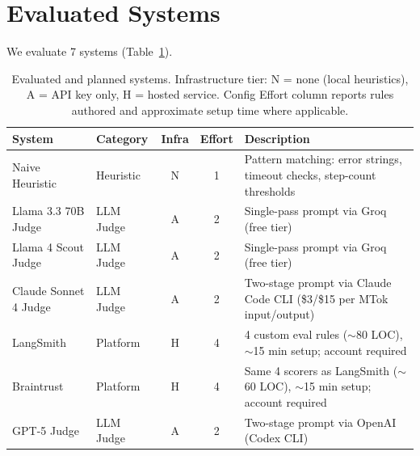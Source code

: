 \documentclass[11pt]{article}
\begin{document}
\section{Evaluated Systems}
\label{sec:systems}

We evaluate 7 systems (Table~\ref{tab:systems}).

\begin{table}[t]
\centering
\caption{Evaluated and planned systems. Infrastructure tier: N = none
(local heuristics), A = API key only, H = hosted service. Config Effort
column reports rules authored and approximate setup time where applicable.
}
\label{tab:systems}
\small
\begin{tabular}{@{}llccp{4.8cm}@{}}
\toprule
\textbf{System} & \textbf{Category} & \textbf{Infra} & \textbf{Effort} & \textbf{Description} \\
\midrule
Naive Heuristic       & Heuristic & N & 1 & Pattern matching: error strings, timeout checks, step-count thresholds \\
Llama 3.3 70B Judge   & LLM Judge & A & 2 & Single-pass prompt via Groq (free tier) \\
Llama 4 Scout Judge   & LLM Judge & A & 2 & Single-pass prompt via Groq (free tier) \\
Claude Sonnet 4 Judge & LLM Judge & A & 2 & Two-stage prompt via Claude Code CLI (\$3/\$15 per MTok input/output) \\
LangSmith             & Platform  & H & 4 & 4 custom eval rules ($\sim$80 LOC), $\sim$15 min setup; account required \\
Braintrust            & Platform  & H & 4 & Same 4 scorers as LangSmith ($\sim$60 LOC), $\sim$15 min setup; account required \\
GPT-5 Judge           & LLM Judge & A & 2 & Two-stage prompt via OpenAI (Codex CLI) \\
\bottomrule
\end{tabular}
\end{table}
\end{document}
